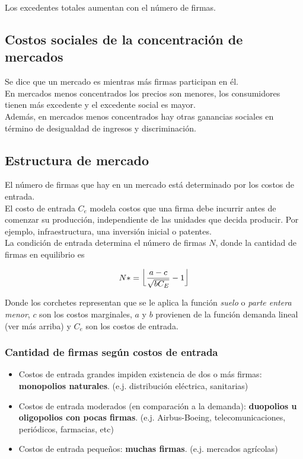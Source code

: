 Los excedentes totales aumentan con el número de firmas.

\subsection{Costos sociales de la concentración de mercados}
Se dice que un mercado es  mientras más firmas participan en él.\\

En mercados menos concentrados los precios son menores, los consumidores tienen más excedente y el excedente social es mayor.\\

Además, en mercados menos concentrados hay otras ganancias sociales en término de desigualdad de ingresos y discriminación.

\subsection{Estructura de mercado}
El número de firmas que hay en un mercado está determinado por los costos de entrada.\\

El costo de entrada $C_e$ modela costos que una firma debe incurrir antes de comenzar su producción, independiente de las unidades que decida producir. Por ejemplo, infraestructura, una inversión inicial o patentes.\\

La condición de entrada determina el número de firmas $N$, donde la cantidad de firmas en equilibrio es

\[N* = \lados{\lfloor}{\frac{a-c}{\sqrt{bC_E}} -1}\]

Donde los corchetes representan que se le aplica la función \textit{suelo} o \textit{parte entera menor}, $c$ son los costos marginales, $a$ y $b$ provienen de la función demanda lineal (ver más arriba) y $C_e$ son los costos de entrada.


\subsubsection{Cantidad de firmas según costos de entrada}

\begin{itemize}
    \item Costos de entrada grandes impiden existencia de dos o más firmas: \textbf{monopolios naturales}. (e.j. distribución eléctrica, sanitarias)
    
    \item Costos de entrada moderados (en comparación a la demanda): \textbf{duopolios u oligopolios con pocas firmas}. (e.j. Airbus-Boeing, telecomunicaciones, periódicos, farmacias, etc)
    
    \item Costos de entrada pequeños: \textbf{muchas firmas}. (e.j. mercados agrícolas)
    
\end{itemize}

